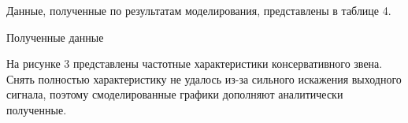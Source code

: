 \documentclass[a4paper, 11pt]{article}
\begin{document}
\par 
Данные, полученные по результатам моделирования, представлены в таблице 4.

\newpage
\begin{table}[h!]
    \begin{threeparttable}
        \caption{Полученные данные} \label{tab:perflogcross}
    \end{threeparttable}
\end{table}

\newpage
\par 
На рисунке 3 представлены частотные характеристики консервативного звена. Снять полностью характеристику не удалось из-за сильного искажения выходного сигнала, поэтому смоделированные графики дополняют аналитически полученные.
\end{document}
